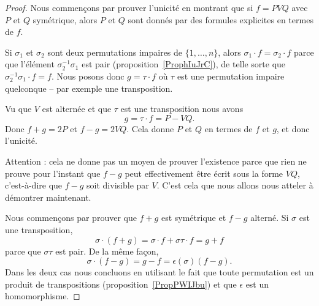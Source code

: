 \begin{proof}

	Nous commençons par prouver l'unicité en montrant que si \( f=PVQ\) avec \( P\) et \( Q\) symétrique, alors \( P\) et \( Q\) sont donnés par des formules explicites en termes de \( f\).


	Si \( \sigma_1\) et \( \sigma_2\) sont deux permutations impaires de \( \{ 1,\ldots, n \}\), alors \( \sigma_1\cdot f=\sigma_2\cdot f\) parce que l'élément \( \sigma_2^{-1}\sigma_1\) est pair (proposition~\ref{ProphIuJrC}), de telle sorte que \( \sigma_2^{-1}\sigma_1\cdot f=f\). Nous posons donc \( g=\tau\cdot f\) où \( \tau\) est une permutation impaire quelconque -- par exemple une transposition.

	Vu que \( V\) est alternée et que \( \tau\) est une transposition nous avons
	\begin{equation}
		g=\tau\cdot f=P-VQ.
	\end{equation}
	Donc \( f+g=2P\) et \( f-g=2VQ\). Cela donne \( P\) et \( Q\) en termes de \( f\) et \( g\), et donc l'unicité.

	Attention : cela ne donne pas un moyen de prouver l'existence parce que rien ne prouve pour l'instant que \( f-g\) peut effectivement être écrit sous la forme \( VQ\), c'est-à-dire que \( f-g\) soit divisible par \( V\). C'est cela que nous allons nous atteler à démontrer maintenant.

	Nous commençons par prouver que \( f+g\) est symétrique et \( f-g\) alterné. Si \( \sigma\) est une transposition,
	\begin{equation}
		\sigma\cdot(f+g)=\sigma\cdot f+\sigma\tau\cdot f=g+f
	\end{equation}
	parce que \( \sigma\tau\) est pair. De la même façon,
	\begin{equation}
		\sigma\cdot(f-g)=g-f=\epsilon(\sigma)(f-g).
	\end{equation}
	Dans les deux cas nous concluons en utilisant le fait que toute permutation est un produit de transpositions (proposition~\ref{PropPWIJbu}) et que \( \epsilon\) est un homomorphisme.


\end{proof}
